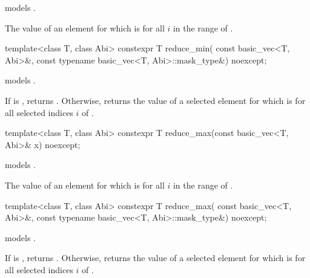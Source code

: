 \begin{itemdescr}
\pnum
\constraints
{} models .

\pnum
\returns
The value of an element  for which  is
 for all $i$ in the range of .
\end{itemdescr}

\begin{itemdecl}
template<class T, class Abi>
  constexpr T reduce_min(
    const basic_vec<T, Abi>&, const typename basic_vec<T, Abi>::mask_type&) noexcept;
\end{itemdecl}

\begin{itemdescr}
\pnum
\constraints
{} models .

\pnum
\returns
If  is , returns
.
Otherwise, returns the value of a selected element  for which
 is  for all selected indices $i$ of
.
\end{itemdescr}

\begin{itemdecl}
template<class T, class Abi> constexpr T reduce_max(const basic_vec<T, Abi>& x) noexcept;
\end{itemdecl}

\begin{itemdescr}
\pnum
\constraints
{} models .

\pnum
\returns
The value of an element  for which  is
 for all $i$ in the range of .
\end{itemdescr}

\begin{itemdecl}
template<class T, class Abi>
  constexpr T reduce_max(
    const basic_vec<T, Abi>&, const typename basic_vec<T, Abi>::mask_type&) noexcept;
\end{itemdecl}

\begin{itemdescr}
\pnum
\constraints
{} models .

\pnum
\returns
If  is , returns
.
Otherwise, returns the value of a selected element  for which
 is  for all selected indices $i$ of
.
\end{itemdescr}

